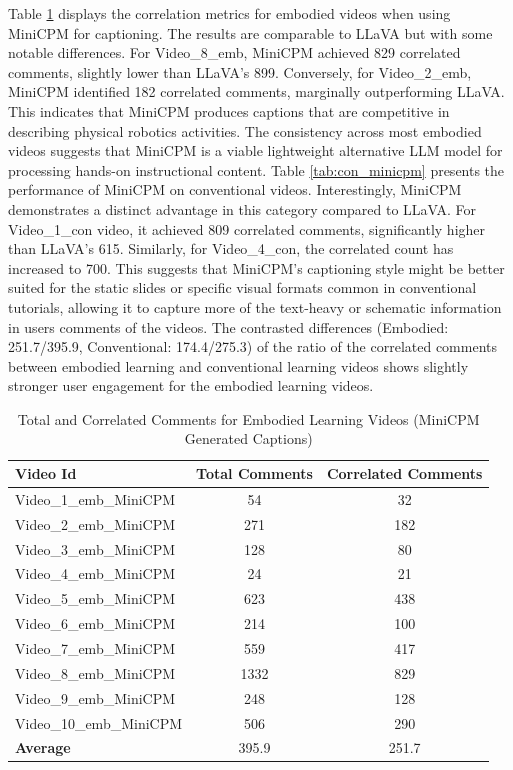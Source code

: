 \documentclass[12pt]{article}
\begin{document}
Table \ref{tab:emb_minicpm} displays the correlation metrics for embodied videos when using MiniCPM for captioning. The results are comparable to LLaVA but with some notable differences. For Video\_8\_emb, MiniCPM achieved 829 correlated comments, slightly lower than LLaVA's 899. Conversely, for Video\_2\_emb, MiniCPM identified 182 correlated comments, marginally outperforming LLaVA. This indicates that MiniCPM produces captions that are competitive in describing physical robotics activities. The consistency across most embodied videos suggests that MiniCPM is a viable lightweight alternative LLM model for processing hands-on instructional content. Table \ref{tab:con_minicpm} presents the performance of MiniCPM on conventional videos. Interestingly, MiniCPM demonstrates a distinct advantage in this category compared to LLaVA. For Video\_1\_con video, it achieved 809 correlated comments, significantly higher than LLaVA's 615. Similarly, for Video\_4\_con, the correlated count has increased to 700. This suggests that MiniCPM's captioning style might be better suited for the static slides or specific visual formats common in conventional tutorials, allowing it to capture more of the text-heavy or schematic information in users comments of the videos. The contrasted differences (Embodied: 251.7/395.9, Conventional: 174.4/275.3) of the ratio of the correlated comments between embodied learning and conventional learning videos shows slightly stronger user engagement for the embodied learning videos. 


\begin{table}[H] %
    \centering
    \caption{Total and Correlated Comments for Embodied Learning Videos (MiniCPM Generated Captions)}
    \label{tab:emb_minicpm}
    \begin{tabular}{lcc}
        \toprule
        \textbf{Video Id} & \textbf{Total Comments} & \textbf{Correlated Comments} \\
        \midrule
        Video\_1\_emb\_MiniCPM  & 54   & 32  \\
        Video\_2\_emb\_MiniCPM  & 271  & 182 \\
        Video\_3\_emb\_MiniCPM  & 128  & 80  \\
        Video\_4\_emb\_MiniCPM  & 24   & 21  \\
        Video\_5\_emb\_MiniCPM  & 623  & 438 \\
        Video\_6\_emb\_MiniCPM  & 214  & 100 \\
        Video\_7\_emb\_MiniCPM  & 559  & 417 \\
        Video\_8\_emb\_MiniCPM  & 1332 & 829 \\
        Video\_9\_emb\_MiniCPM  & 248  & 128 \\
        Video\_10\_emb\_MiniCPM & 506  & 290 \\
        \textbf{Average} & 395.9 & 251.7 \\
        \bottomrule
    \end{tabular}
\end{table}
\end{document}
